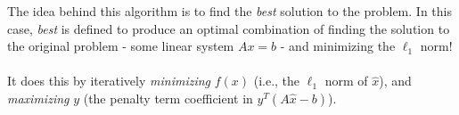 \documentclass{article}
\begin{document}
\begin{center}
\end{center}
The idea behind this algorithm is to find the \textit{best} solution to the
problem.  In this case, \textit{best} is defined to produce an optimal
combination of finding the solution to the original problem - some linear
system $Ax=b$ - and minimizing the $\ell_1$ norm!
\\ \\
It does this by iteratively
\textit{minimizing} $f(x)$ (i.e., the $\ell_1$ norm of $\hat{x}$), and \textit{maximizing}
$y$ (the penalty term coefficient in $y^T(A\hat{x}-b)$).
\\ \\
\end{document}
